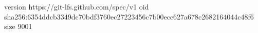 version https://git-lfs.github.com/spec/v1
oid sha256:6354ddcb3349dc70bdf3760ec27223456c7b00ecc627a678c2682164044c48f6
size 9001
